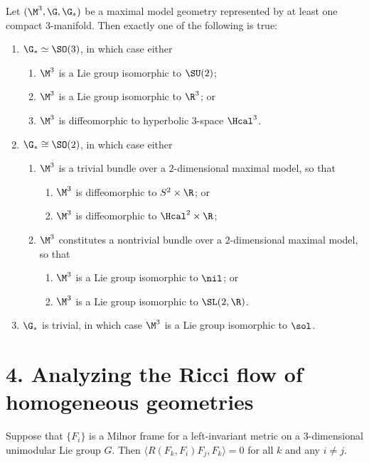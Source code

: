 \begin{proposition}
\label{ch01-prop-classification-maximal-models}
Let $(\M^3,\G,\G_*)$ be a maximal model geometry represented by at least one compact $3$-manifold. Then exactly one of the following is true:
\begin{enumerate}
\item $\G_* \simeq \SO(3)$, in which case either
\begin{enumerate}
\item $\M^3$ is a Lie group isomorphic to $\SU(2)$;
\item $\M^3$ is a Lie group isomorphic to $\R^3$; or
\item $\M^3$ is diffeomorphic to hyperbolic $3$-space $\Hcal^3$.
\end{enumerate}
\item $\G_* \cong \SO(2)$, in which case either
\begin{enumerate}
\item $\M^3$ is a trivial bundle over a $2$-dimensional maximal model, so that
\begin{enumerate}
\item $\M^3$ is diffeomorphic to $S^2 \times \R$; or
\item $\M^3$ is diffeomorphic to $\Hcal^2 \times \R$;
\end{enumerate}
\item $\M^3$ constitutes a nontrivial bundle over a $2$-dimensional maximal model, so that
\begin{enumerate}
\item $\M^3$ is a Lie group isomorphic to $\nil$; or
\item $\M^3$ is a Lie group isomorphic to $\SL(2,\R)$.
\end{enumerate}
\end{enumerate}
\item $\G_*$ is trivial, in which case $\M^3$ is a Lie group isomorphic to $\sol$.
\end{enumerate}
\end{proposition}

\section*{4. Analyzing the Ricci flow of homogeneous geometries}

\begin{lemma}
\label{ch01-lem-curvature-offdiagonal}
Suppose that $\{F_i\}$ is a Milnor frame for a left-invariant metric on a $3$-dimensional unimodular Lie group $G$. Then $\langle R(F_k,F_i)F_j,F_k\rangle = 0$ for all $k$ and any $i\neq j$.
\end{lemma}

